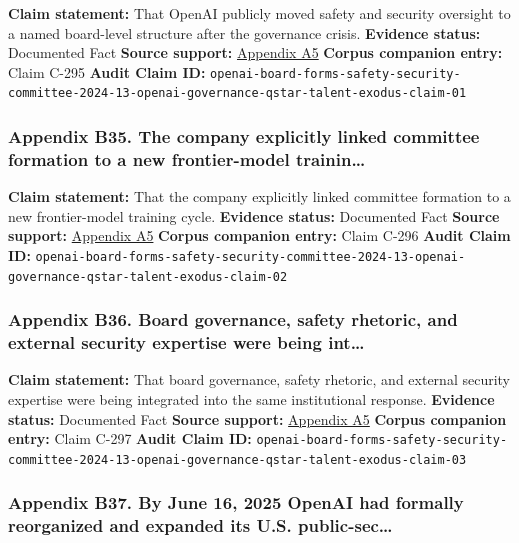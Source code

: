 \documentclass[
  american,
  11pt,
  letterpaper,
]{article}
\begin{document}
\textbf{Claim statement:} That OpenAI publicly moved safety and security
oversight to a named board-level structure after the governance crisis.
\textbf{Evidence status:} Documented Fact \textbf{Source support:}
\hyperref[appendix-a5-openai-board-forms-safety-and-security-committee]{Appendix
A5} \textbf{Corpus companion entry:} Claim C-295 \textbf{Audit Claim
ID:}
\texttt{openai-board-forms-safety-security-committee-2024-13-openai-governance-qstar-talent-exodus-claim-01}

\subsubsection{Appendix B35. The company explicitly linked committee
formation to a new frontier-model
trainin\ldots{}}\label{appendix-b35-the-company-explicitly-linked-committee-formation-to-a-new-frontier-model-trainin}

\textbf{Claim statement:} That the company explicitly linked committee
formation to a new frontier-model training cycle. \textbf{Evidence
status:} Documented Fact \textbf{Source support:}
\hyperref[appendix-a5-openai-board-forms-safety-and-security-committee]{Appendix
A5} \textbf{Corpus companion entry:} Claim C-296 \textbf{Audit Claim
ID:}
\texttt{openai-board-forms-safety-security-committee-2024-13-openai-governance-qstar-talent-exodus-claim-02}

\subsubsection{Appendix B36. Board governance, safety rhetoric, and
external security expertise were being
int\ldots{}}\label{appendix-b36-board-governance-safety-rhetoric-and-external-security-expertise-were-being-int}

\textbf{Claim statement:} That board governance, safety rhetoric, and
external security expertise were being integrated into the same
institutional response. \textbf{Evidence status:} Documented Fact
\textbf{Source support:}
\hyperref[appendix-a5-openai-board-forms-safety-and-security-committee]{Appendix
A5} \textbf{Corpus companion entry:} Claim C-297 \textbf{Audit Claim
ID:}
\texttt{openai-board-forms-safety-security-committee-2024-13-openai-governance-qstar-talent-exodus-claim-03}

\subsubsection{Appendix B37. By June 16, 2025 OpenAI had formally
reorganized and expanded its U.S.
public-sec\ldots{}}\label{appendix-b37-by-june-16-2025-openai-had-formally-reorganized-and-expanded-its-u-s-public-sec}
\end{document}
